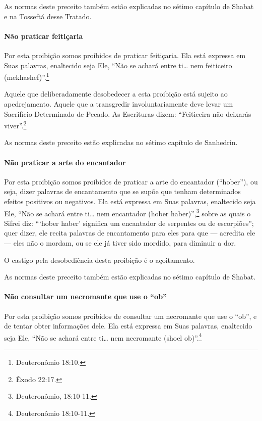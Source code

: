 As normas deste preceito também estão explicadas no sétimo capítulo de
Shabat e na Tosseftá desse Tratado.

\paragraph{Não praticar feitiçaria}

Por esta proibição somos proibidos de praticar feitiçaria. Ela está
expressa em Suas palavras, enaltecido seja Ele, ``Não se achará entre
ti\ldots{} nem feiticeiro (mekhashef)''.\footnote{Deuteronômio 18:10.}

Aquele que deliberadamente desobedecer a esta proibição está sujeito ao
apedrejamento. Aquele que a transgredir involuntariamente deve levar um
Sacrifício Determinado de Pecado. As Escrituras dizem: ``Feiticeira não
deixarás viver''.\footnote{Êxodo 22:17.}

As normas deste preceito estão explicadas no sétimo capítulo de Sanhedrin.

\paragraph{Não praticar a arte do encantador}

Por esta proibição somos proibidos de praticar a arte do encantador
(``hober''), ou seja, dizer palavras de encantamento que se supõe que
tenham determinados efeitos positivos ou negativos. Ela está expressa em
Suas palavras, enaltecido seja Ele, ``Não se achará entre ti\ldots{} nem
encantador (hober haber)'',\footnote{Deuteronômio, 18:10-11.} sobre as quais o
Sifrei diz: ```hober haber' significa um encantador de serpentes ou de
escorpiões''; quer dizer, ele recita palavras de encantamento para eles
para que --- acredita ele --- eles não o mordam, ou se ele já tiver sido
mordido, para diminuir a dor.

O castigo pela desobediência desta proibição é o açoitamento.

As normas deste preceito também estão explicadas no sétimo capítulo de
Shabat.

\paragraph{Não consultar um necromante que use o ``ob''}

Por esta proibição somos proibidos de consultar um necromante que use o
``ob'', e de tentar obter informações dele. Ela está expressa em Suas
palavras, enaltecido seja Ele, ``Não se achará entre ti\ldots{} nem
necromante (shoel ob)''.\footnote{Deuteronômio 18:10-11.}

